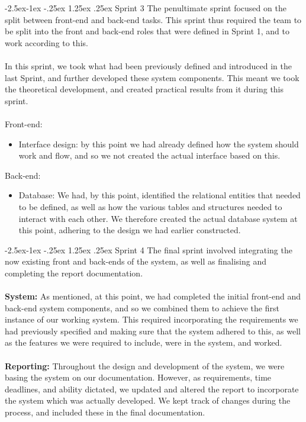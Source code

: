 \documentclass[paper=a4, fontsize=11pt]{scrartcl}
\makeatletter
\numberwithin{equation}{section}		%
\numberwithin{figure}{section}			%
\numberwithin{table}{section}				%
\renewcommand\paragraph{\@startsection{paragraph}{4}{\z@}%
            {-2.5ex\@plus -1ex \@minus -.25ex}%
            {1.25ex \@plus .25ex}%
            {\normalfont\normalsize\bfseries}}
\makeatother
\begin{document}
\paragraph{Sprint 3}
The penultimate sprint focused on the split between front-end and back-end tasks. This sprint thus required the team to be split into the front and back-end roles that were defined in Sprint 1, and to work according to this.\\\\In this sprint, we took what had been previously defined and introduced in the last Sprint, and further developed these system components. This meant we took the theoretical development, and created practical results from it during this sprint.\\\\Front-end:
\begin{itemize}
\item Interface design: by this point we had already defined how the system should work and flow, and so we not created the actual interface based on this.
\end{itemize}
Back-end:
\begin{itemize}
\item Database: We had, by this point, identified the relational entities that needed to be defined, as well as how the various tables and structures needed to interact with each other. We therefore created the actual database system at this point, adhering to the design we had earlier constructed.
\end{itemize}

\paragraph{Sprint 4}
The final sprint involved integrating the now existing front and back-ends of the system, as well as finalising and completing the report documentation.\\\\\textbf{System:} As mentioned, at this point, we had completed the initial front-end and back-end system components, and so we combined them to achieve the first instance of our working system. This required incorporating the requirements we had previously specified and making sure that the system adhered to this, as well as the features we were required to include, were in the system, and worked.\\\\\textbf{Reporting:} Throughout the design and development of the system, we were basing the system on our documentation. However, as requirements, time deadlines, and ability dictated, we updated and altered the report to incorporate the system which was actually developed. We kept track of changes during the process, and included these in the final documentation.
\end{document}

